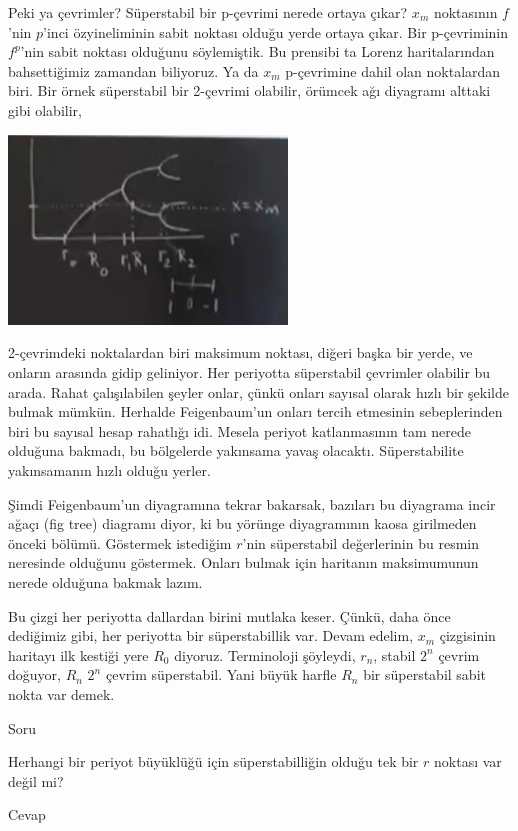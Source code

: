 \documentclass[12pt,fleqn]{article}\usepackage{../../common}
\begin{document}
Peki ya çevrimler? Süperstabil bir p-çevrimi nerede ortaya çıkar? $x_m$
noktasının $f$'nin $p$'inci özyineliminin sabit noktası olduğu yerde ortaya
çıkar. Bir p-çevriminin $f^p$'nin sabit noktası olduğunu söylemiştik. Bu
prensibi ta Lorenz haritalarından bahsettiğimiz zamandan biliyoruz. Ya da $x_m$
p-çevrimine dahil olan noktalardan biri. Bir örnek süperstabil bir 2-çevrimi
olabilir, örümcek ağı diyagramı alttaki gibi olabilir,

\includegraphics[width=20em]{21_02.png}

2-çevrimdeki noktalardan biri maksimum noktası, diğeri başka bir yerde, ve
onların arasında gidip geliniyor. Her periyotta süperstabil çevrimler olabilir
bu arada. Rahat çalışılabilen şeyler onlar, çünkü onları sayısal olarak hızlı
bir şekilde bulmak mümkün. Herhalde Feigenbaum'un onları tercih etmesinin
sebeplerinden biri bu sayısal hesap rahatlığı idi. Mesela periyot katlanmasının
tam nerede olduğuna bakmadı, bu bölgelerde yakınsama yavaş
olacaktı. Süperstabilite yakınsamanın hızlı olduğu yerler.

Şimdi Feigenbaum'un diyagramına tekrar bakarsak, bazıları bu diyagrama
incir ağaçı (fig tree) diagramı diyor, ki bu yörünge diyagramının kaosa
girilmeden önceki bölümü. Göstermek istediğim $r$'nin süperstabil
değerlerinin bu resmin neresinde olduğunu göstermek. Onları bulmak için
haritanın maksimumunun nerede olduğuna bakmak lazım.

Bu çizgi her periyotta dallardan birini mutlaka keser. Çünkü, daha önce
dediğimiz gibi, her periyotta bir süperstabillik var. Devam edelim, $x_m$
çizgisinin haritayı ilk kestiği yere $R_0$ diyoruz. Terminoloji şöyleydi, $r_n$,
stabil $2^n$ çevrim doğuyor, $R_n$ $2^n$ çevrim süperstabil. Yani büyük harfle
$R_n$ bir süperstabil sabit nokta var demek.

Soru

Herhangi bir periyot büyüklüğü için süperstabilliğin olduğu tek bir $r$ noktası
var değil mi?

Cevap
\end{document}
